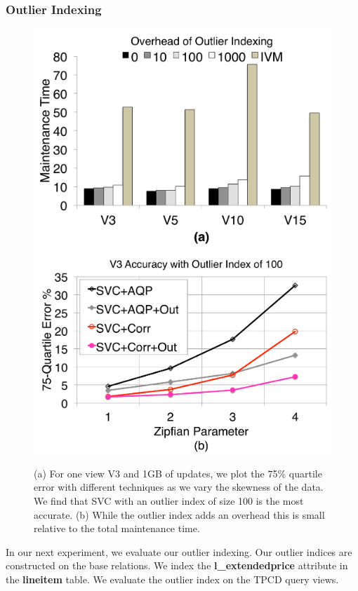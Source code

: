 \subsubsection{Outlier Indexing}

\begin{figure}[t]
\centering
 \includegraphics[scale=0.13]{exp/msoi_1.pdf}
 \includegraphics[scale=0.13]{exp/msoi_2.pdf}\vspace{-1em}
 \caption{(a) For one view V3 and 1GB of updates, we plot the 75\% quartile error with different techniques as we vary the skewness of the data. We find that SVC with an outlier index of size 100 is the most accurate. (b) While the outlier index adds an overhead this is small relative to the total maintenance time. \vspace{-1em}\label{exp5-oi}}
\end{figure}
In our next experiment, we evaluate our outlier indexing.
Our outlier indices are constructed on the base relations.
We index the \textbf{l\_extendedprice} attribute in the \textbf{lineitem} table.
We evaluate the outlier index on the TPCD query views.


